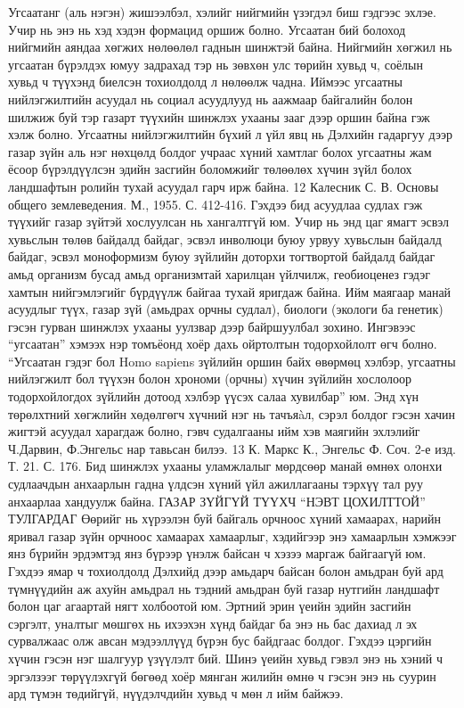 Угсаатанг (аль нэгэн) жишээлбэл, хэлийг нийгмийн үзэгдэл биш гэдгээс эхлэе. Учир нь энэ нь хэд хэдэн формацид оршиж болно. Угсаатан бий болоход нийгмийн аяндаа хөгжих нөлөөлөл гаднын шинжтэй байна. Нийгмийн хөгжил нь угсаатан бүрэлдэх юмуу задрахад тэр нь зөвхөн улс төрийн хувьд ч, соёлын хувьд ч түүхэнд биелсэн тохиолдолд л нөлөөлж чадна. Иймээс угсаатны нийлэгжилтийн асуудал нь социал асуудлууд нь аажмаар байгалийн болон шилжиж буй тэр газарт түүхийн шинжлэх ухааны зааг дээр оршин байна гэж хэлж болно.
Угсаатны нийлэгжилтийн бүхий л үйл явц нь Дэлхийн гадаргуу дээр газар зүйн аль нэг нөхцөлд болдог учраас хүний хамтлаг болох угсаатны жам ёсоор бүрэлдүүлсэн эдийн засгийн боломжийг төлөөлөх хүчин зүйл болох ландшафтын ролийн тухай асуудал гарч ирж байна.
12 Калесник С. В. Основы общего землеведения. М., 1955. С. 412-416.
Гэхдээ бид асуудлаа судлах гэж түүхийг газар зүйтэй хослуулсан нь хангалтгүй юм. Учир нь энд цаг ямагт эсвэл хувьслын төлөв байдалд байдаг, эсвэл инволюци буюу урвуу хувьслын байдалд байдаг, эсвэл моноформизм буюу зүйлийн доторхи тогтвортой байдалд байдаг амьд организм бусад амьд организмтай харилцан үйлчилж, геобиоценез гэдэг хамтын нийгэмлэгийг бүрдүүлж байгаа тухай яригдаж байна.
Ийм маягаар манай асуудлыг түүх, газар зүй (амьдрах орчны судлал), биологи (экологи ба генетик) гэсэн гурван шинжлэх ухааны уулзвар дээр байршуулбал зохино. Ингэвээс “угсаатан” хэмээх нэр томъёонд хоёр дахь ойртолтын тодорхойлолт өгч болно. “Угсаатан гэдэг бол Homo sapiens зүйлийн оршин байх өвөрмөц хэлбэр, угсаатны нийлэгжилт бол түүхэн болон хрономи (орчны) хүчин зүйлийн хослолоор тодорхойлогдох зүйлийн дотоод хэлбэр үүсэх салаа хувилбар” юм.
Энд хүн төрөлхтний хөгжлийн хөдөлгөгч хүчний нэг нь тачъяàл, сэрэл болдог гэсэн хачин жигтэй асуудал харагдаж болно, гэвч судалгааны ийм хэв маягийн эхлэлийг Ч.Дарвин, Ф.Энгельс нар тавьсан билээ.
13 К. Маркс К., Энгельс Ф. Соч. 2-е изд. Т. 21. С. 176.
Бид шинжлэх ухааны уламжлалыг мөрдсөөр манай өмнөх олонхи судлаачдын анхаарлын гадна үлдсэн хүний үйл ажиллагааны тэрхүү тал руу анхаарлаа хандуулж байна.
ГАЗАР ЗҮЙГҮЙ ТҮҮХЧ “НЭВТ ЦОХИЛТТОЙ” ТУЛГАРДАГ
Өөрийг нь хүрээлэн буй байгаль орчноос хүний хамаарах, нарийн яривал газар зүйн орчноос хамаарах хамаарлыг, хэдийгээр энэ хамаарлын хэмжээг янз бүрийн эрдэмтэд янз бүрээр үнэлж байсан ч хэзээ маргаж байгаагүй юм. Гэхдээ ямар ч тохиолдолд Дэлхийд дээр амьдарч байсан болон амьдран буй ард түмнүүдийн аж ахуйн амьдрал нь тэдний амьдран буй газар нутгийн ландшафт болон цаг агаартай нягт холбоотой юм. Эртний эрин үеийн эдийн засгийн сэргэлт, уналтыг мөшгөх нь ихээхэн хүнд байдаг ба энэ нь бас дахиад л эх сурвалжаас олж авсан мэдээллүүд бүрэн бус байдгаас болдог. Гэхдээ цэргийн хүчин гэсэн нэг шалгуур үзүүлэлт бий. Шинэ үеийн хувьд гэвэл энэ нь хэний ч эргэлзээг төрүүлэхгүй бөгөөд хоёр мянган жилийн өмнө ч гэсэн энэ нь суурин ард түмэн төдийгүй, нүүдэлчдийн хувьд ч мөн л ийм байжээ.
